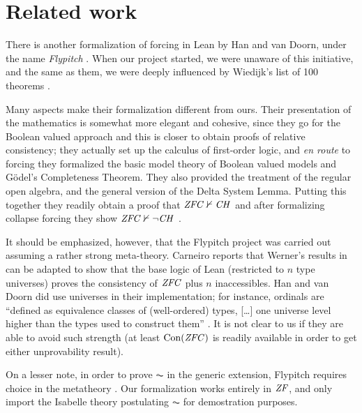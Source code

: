 \section{Related work}
\label{sec:related-work}

There is another formalization of forcing in Lean by Han and van
Doorn, under the name \emph{Flypitch} \cite{han_et_al:LIPIcs:2019:11074,DBLP:conf/cpp/HanD20}. When our project started, we
were unaware of this initiative, and the same as them, we were deeply
influenced by Wiedijk's list of 100 theorems \cite{Formalizing100}.

Many aspects make their formalization different from ours. Their
presentation of the mathematics is somewhat more elegant and cohesive,
since they go for the Boolean valued approach and this is closer to
obtain proofs of relative consistency; they actually set up the
calculus of first-order logic, and \emph{en route} to forcing they
formalized the basic model theory of Boolean valued models and Gödel's
Completeness Theorem. They also provided the treatment of the regular
open algebra, and the general version of the Delta System
Lemma. Putting this together they readily obtain a proof that
$\mathit{ZFC}\nvdash \mathit{CH}$ \cite{han_et_al:LIPIcs:2019:11074} and after
formalizing collapse forcing they show  $\mathit{ZFC}\nvdash \neg\mathit{CH}$
\cite[Sect.~5.6]{DBLP:conf/cpp/HanD20}.

It should be emphasized, however, that the Flypitch project was
carried out assuming a rather strong meta-theory. 
Carneiro \cite{carneiro-ms-thesis} reports that Werner's results in
\cite{10.5555/645869.668660} can be adapted to show that the base
logic  of Lean (restricted to $n$
type universes) proves the consistency of $\mathit{ZFC}$ plus $n$
inaccessibles. Han and van Doorn did use universes in their
implementation; for instance, ordinals are “defined as equivalence
classes of (well-ordered) types, [\dots] one
universe level higher than the types used to construct them”
\cite{han_et_al:LIPIcs:2019:11074}. It is not clear to us if they are
able to avoid such strength (at least $\operatorname{Con}(\mathit{ZFC})$ is readily
available in order to get either unprovability result).

On a lesser note, in order to prove $\AC$ in the generic extension,
Flypitch requires choice in the metatheory
\cite[p.~11]{han_et_al:LIPIcs:2019:11074}. Our formalization works
entirely in $\mathit{ZF}$, and only import the Isabelle theory postulating
$\AC$ for demostration purposes.

